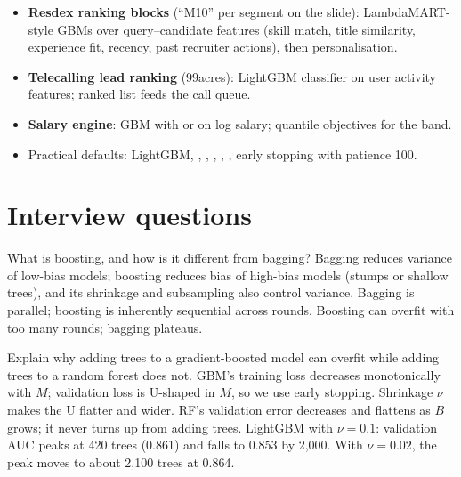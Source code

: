 \begin{practical}
\begin{itemize}
\item \textbf{Resdex ranking blocks} (``M10'' per segment on the slide): LambdaMART-style GBMs over query--candidate features
  (skill match, title similarity, experience fit, recency, past recruiter actions), then personalisation.
\item \textbf{Telecalling lead ranking} (99acres): LightGBM classifier on user activity features; ranked list feeds the call queue.
\item \textbf{Salary engine}: GBM with  or on log salary; quantile objectives for the band.
\item Practical defaults: LightGBM, , , ,
  , , early stopping with patience 100.
\end{itemize}
\end{practical}

\section{Interview questions}

\begin{qa}{ What is boosting, and how is it different from bagging?}
\why Bagging reduces variance of low-bias models; boosting reduces bias of high-bias models (stumps or shallow trees), and its
shrinkage and subsampling also control variance. Bagging is parallel; boosting is inherently sequential across rounds. Boosting can
overfit with too many rounds; bagging plateaus.
\end{qa}

\begin{qa}{ Explain why adding trees to a
gradient-boosted model can overfit while adding trees to a random forest does not.}
\why GBM's training loss decreases monotonically with $M$; validation loss is U-shaped in $M$, so we use early stopping. Shrinkage
$\nu$ makes the U flatter and wider. RF's validation error decreases and flattens as $B$ grows; it never turns up from adding trees.
\worked LightGBM with $\nu = 0.1$: validation AUC peaks at 420 trees (0.861) and falls to 0.853 by 2{,}000. With $\nu = 0.02$, the peak
moves to about 2{,}100 trees at 0.864.
\end{qa}

